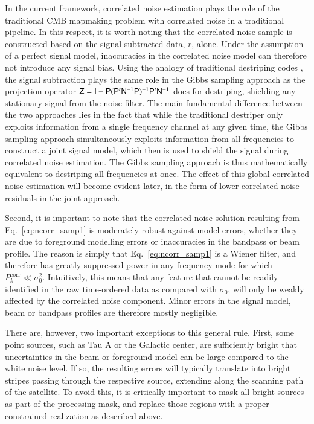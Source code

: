 \documentclass[twocolumn]{aa}
\newcommand{\N}[0]{\tens{N}}
\newcommand{\Z}[0]{\tens{Z}}
\newcommand{\I}[0]{\tens{I}}
\renewcommand{\P}[0]{\tens{P}}
\begin{document}
In the current framework, correlated noise estimation plays the role
of the traditional CMB mapmaking problem with correlated noise in a
traditional pipeline. In this respect, it is worth noting that the
correlated noise sample is constructed based on the signal-subtracted
data, $r$, alone. Under the assumption of a perfect signal model,
inaccuracies in the correlated noise model can therefore not introduce
any signal bias. Using the analogy of traditional destriping codes
\citep[e.g.,][]{Maino1999,Keihanen2004, Keihanen2005,Keihanen2010}, the signal
subtraction plays the same role in the Gibbs sampling approach as the
projection operator $\Z = \I - \P(\P^t \N^{-1}\P)^{-1}\P^t\N^{-1}$
does for destriping, shielding any stationary signal from the noise
filter. The main fundamental difference between the two approaches
lies in the fact that while the traditional destriper only exploits
information from a single frequency channel at any given time, the
Gibbs sampling approach simultaneously exploits information from all
frequencies to construct a joint signal model, which then is used to
shield the signal during correlated noise estimation. The Gibbs
sampling approach is thus mathematically equivalent to destriping all
frequencies at once. The effect of this global correlated noise
estimation will become evident later, in the form of lower correlated
noise residuals in the joint approach.

Second, it is important to note that the correlated noise solution
resulting from Eq.~\eqref{eq:ncorr_samp1} is moderately robust against
model errors, whether they are due to foreground modelling errors or
inaccuracies in the bandpass or beam profile. The reason is simply
that Eq.~\eqref{eq:ncorr_samp1} is a Wiener filter, and therefore has
greatly suppressed power in any frequency mode for which
$P^{\mathrm{corr}}_k \ll \sigma_0^2$. Intuitively, this means that any
feature that cannot be readily identified in the raw time-ordered data
as compared with $\sigma_0$, will only be weakly affected by the
correlated noise component. Minor errors in the signal model, beam or
bandpass profiles are therefore mostly negligible.

There are, however, two important exceptions to this general
rule. First, some point sources, such as Tau A or the Galactic center,
are sufficiently bright that uncertainties in the beam or foreground
model can be large compared to the white noise level. If so, the
resulting errors will typically translate into bright stripes passing
through the respective source, extending along the scanning path of
the satellite. To avoid this, it is critically important to mask all
bright sources as part of the processing mask, and replace those
regions with a proper constrained realization as described above. 
\end{document}
